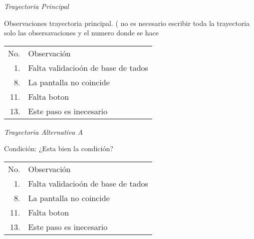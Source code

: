 \documentclass[10pt,spanish]{article}
\providecommand{\tabularnewline}{\\}
\begin{document}


\textit{\large Trayectoria Principal}{\large {} }{\large \par}

Observaciones trayectoria principal. ( no es necesario escribir toda
la trayectoria solo las obsersavaciones y el numero donde se hace%
\begin{longtable}{rp{8cm}}
No.  & Observación\tabularnewline
1.  & Falta validacioón de base de tados\tabularnewline
8.  & La pantalla no coincide\tabularnewline
11.  & Falta boton\tabularnewline
13.  & Este paso es inecesario\tabularnewline
\end{longtable}

\textit{Trayectoria Alternativa A}

Condición: ¿Esta bien la condición?

\begin{longtable}{rp{8cm}}
No.  & Observación\tabularnewline
1.  & Falta validacioón de base de tados\tabularnewline
8.  & La pantalla no coincide\tabularnewline
11.  & Falta boton\tabularnewline
13.  & Este paso es inecesario\tabularnewline
\end{longtable}%
\newpage{} 
\end{document}

